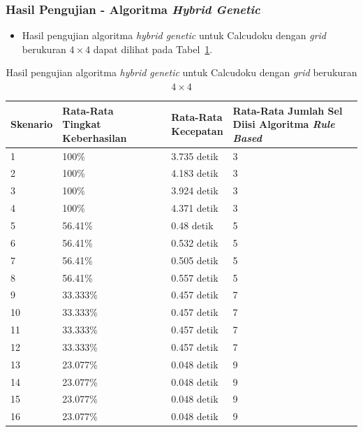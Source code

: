 \documentclass{beamer}
\begin{document}
\begin{frame}
\frametitle{Hasil Pengujian - Algoritma \textit{Hybrid Genetic}}
\begin{itemize}
\item Hasil pengujian algoritma \textit{hybrid genetic} untuk Calcudoku dengan \textit{grid} berukuran \begin{math}4 \times 4\end{math} dapat dilihat pada Tabel~\ref{tab:pengujianhg1}.
\end{itemize}
\begin{table}
\tiny
\centering
\captionsetup{justification=centering}
\caption[Hasil pengujian algoritma \textit{hybrid genetic} untuk Calcudoku dengan \textit{grid} berukuran \begin{math}4 \times 4\end{math}]{Hasil pengujian algoritma \textit{hybrid genetic} untuk Calcudoku dengan \textit{grid} berukuran \begin{math}4 \times 4\end{math}}
\begin{tabular}{| l | l | l | l |}
\hline
Skenario & \makecell[c]{Rata-Rata \\ Tingkat Keberhasilan} & \makecell[c]{Rata-Rata \\ Kecepatan} & \makecell[c]{Rata-Rata Jumlah Sel \\ Diisi Algoritma \textit{Rule Based}} \\
\hline \hline
1& 100\% & 3.735 detik & 3 \\
\hline
2 & 100\% & 4.183 detik & 3 \\
\hline
3 & 100\% & 3.924 detik & 3 \\
\hline
4 & 100\% & 4.371 detik & 3 \\
\hline
5 & 56.41\% & 0.48 detik & 5 \\
\hline
6 & 56.41\% & 0.532 detik & 5 \\
\hline
7 & 56.41\% & 0.505 detik & 5 \\
\hline
8 & 56.41\% & 0.557 detik & 5 \\
\hline
9 & 33.333\% & 0.457 detik & 7 \\
\hline
10 & 33.333\% & 0.457 detik & 7 \\
\hline
11 & 33.333\% & 0.457 detik & 7 \\
\hline
12 & 33.333\% & 0.457 detik & 7 \\
\hline
13 & 23.077\% & 0.048 detik & 9 \\
\hline
14 & 23.077\% & 0.048 detik & 9 \\
\hline
15 & 23.077\% & 0.048 detik & 9 \\
\hline
16 & 23.077\% & 0.048 detik & 9 \\
\hline
\end{tabular}
\label{tab:pengujianhg1}
\end{table}
\end{frame}
\end{document}
